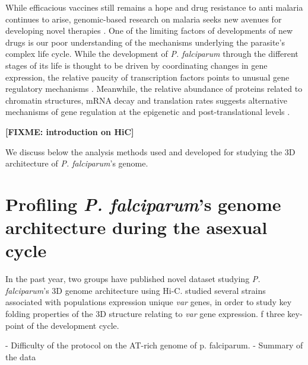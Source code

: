 \documentclass[letterpaper,12pt]{article}
\newcommand{\fixme}[1]{\textbf{[FIXME: #1]}}
\begin{document}
While efficacious vaccines still remains a hope and drug resistance to anti
malaria continues to arise, genomic-based research on malaria seeks new
avenues for developing novel therapies \citet{kirchner:recent}. One of the
limiting factors of developments of new drugs is our poor understanding of the
mechanisms underlying the parasite's complex life cycle. While the development
of {\em P. falciparum} through the different stages of its life is thought to
be driven by coordinating changes in gene expression, the relative paucity of
transcription factors points to unusual gene regulatory mechanisms . Meanwhile,
the relative abundance of proteins related to chromatin structures, mRNA decay
and translation rates suggests alternative mechanisms of gene regulation at the
epigenetic and post-translational levels
\citep{cui:chromatin-mediated, duffy:role, hoeijmakers:placing,
horrocks:control, deitsch:mechanisms}.


\fixme{introduction on HiC}


We discuss below the analysis methods used and developed for studying the 3D
architecture of {\em P. falciparum}'s genome.

\section{Profiling {\em P. falciparum}'s genome architecture during the
asexual cycle}
\label{sec:data}

In the past year, two groups have published novel dataset studying {\em P.
falciparum}'s 3D genome architecture using Hi-C. \citet{lemieux:genome-wide}
studied several strains associated with populations expression unique
\textit{var} genes, in order to study key folding properties of the 3D
structure relating to \textit{var} gene expression.
\citet{ay:three-dimensional} f three key-point of the development
cycle.

- Difficulty of the protocol on the AT-rich genome of p. falciparum.
- Summary of the data
\end{document}
